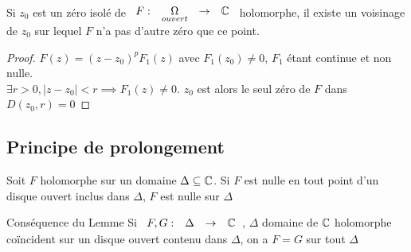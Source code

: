 \documentclass[]{report}
\begin{document}
\begin{lm}{}{}
    Si $z_0$ est un zéro isolé de $\begin{array}{ccccc} F : & \underset{ouvert}{\Omega} & \to & \mathbb{C} \end{array}$ holomorphe, il existe un voisinage de $z_0$ sur lequel $F$ n'a pas d'autre zéro que ce point.
\end{lm}

\begin{proof}{}{}
    $F(z)=(z-z_0)^pF_1(z)$ avec $F_1(z_0)\neq 0$, $F_1$ étant continue et non nulle.\\
    $\exists r>0,|z-z_0|<r\implies F_1(z)\neq 0$. $z_0$ est alors le seul zéro de $F$ dans $D(z_0,r)=0$
\end{proof}

\subsection{Principe de prolongement}

\begin{lm}{}{}
    Soit $F$ holomorphe sur un domaine $\Delta\subseteq\mathbb{C}$. Si $F$ est nulle en tout point d'un disque ouvert inclus dans $\Delta$, $F$ est nulle sur $\Delta$
\end{lm}

\begin{prop}{Conséquence du Lemme}{}
    Si $\begin{array}{ccccc} F,G : & \Delta & \to & \mathbb{C} \end{array}$, $\Delta$ domaine de $\mathbb{C}$ holomorphe coïncident sur un disque ouvert contenu dans $\Delta$, on a $F=G$ sur tout $\Delta$
\end{prop}
\end{document}
